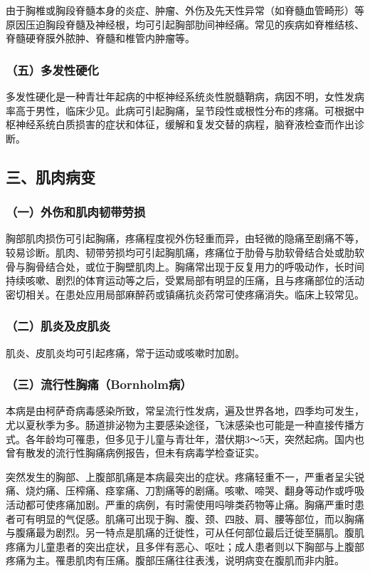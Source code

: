 由于胸椎或胸段脊髓本身的炎症、肿瘤、外伤及先天性异常（如脊髓血管畸形）等原因压迫胸段脊髓及神经根，均可引起胸部肋间神经痛。常见的疾病如脊椎结核、脊髓硬脊膜外脓肿、脊髓和椎管内肿瘤等。

\subsubsection{（五）多发性硬化}

多发性硬化是一种青壮年起病的中枢神经系统炎性脱髓鞘病，病因不明，女性发病率高于男性，临床少见。此病可引起胸痛，呈节段性或根性分布的疼痛。可根据中枢神经系统白质损害的症状和体征，缓解和复发交替的病程，脑脊液检查而作出诊断。

\subsection{三、肌肉病变}

\subsubsection{（一）外伤和肌肉韧带劳损}

胸部肌肉损伤可引起胸痛，疼痛程度视外伤轻重而异，由轻微的隐痛至剧痛不等，较易诊断。肌肉、韧带劳损均可引起胸肌痛，疼痛位于肋骨与肋软骨结合处或肋软骨与胸骨结合处，或位于胸壁肌肉上。胸痛常出现于反复用力的呼吸动作，长时间持续咳嗽、剧烈的体育运动等之后，受累局部有明显的压痛，且与疼痛部位的活动密切相关。在患处应用局部麻醉药或镇痛抗炎药常可使疼痛消失。临床上较常见。

\subsubsection{（二）肌炎及皮肌炎}

肌炎、皮肌炎均可引起疼痛，常于运动或咳嗽时加剧。

\subsubsection{（三）流行性胸痛（Bornholm病）}

本病是由柯萨奇病毒感染所致，常呈流行性发病，遍及世界各地，四季均可发生，尤以夏秋季为多。肠道排泌物为主要感染途径，飞沫感染也可能是一种直接传播方式。各年龄均可罹患，但多见于儿童与青壮年，潜伏期3～5天，突然起病。国内也曾有散发的流行性胸痛病例报告，但未有病毒学检查证实。

突然发生的胸部、上腹部肌痛是本病最突出的症状。疼痛轻重不一，严重者呈尖锐痛、烧灼痛、压榨痛、痉挛痛、刀割痛等的剧痛。咳嗽、啼哭、翻身等动作或呼吸活动都可使疼痛加剧。严重的病例，有时需使用吗啡类药物等止痛。胸痛严重时患者可有明显的气促感。肌痛可出现于胸、腹、颈、四肢、肩、腰等部位，而以胸痛与腹痛最为剧烈。另一特点是肌痛的迁徙性，可从任何部位最后迁徙至膈肌。腹肌疼痛为儿童患者的突出症状，且多伴有恶心、呕吐；成人患者则以下胸部与上腹部疼痛为主。罹患肌肉有压痛。腹部压痛往往表浅，说明病变在腹肌而非内脏。

